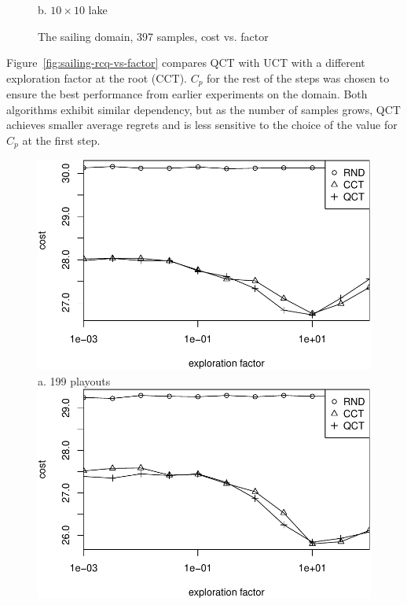 \documentclass{article}
\begin{document}
\begin{figure}[ht]
\begin{minipage}[b]{0.333\linewidth}
    b. $10\times 10$ lake
  \end{minipage}
  \caption{The sailing domain, 397 samples, cost vs. factor}
  \label{fig:sailing-lake-size}
\end{figure}

Figure~\ref{fig:sailing-rcq-vs-factor} compares QCT with UCT with a
different exploration factor at the root (CCT). $C_p$ for the rest of
the steps was chosen to ensure the best performance from earlier
experiments on the domain. Both algorithms exhibit similar dependency,
but as the number of samples grows, QCT achieves smaller average
regrets and is less sensitive to the choice of the value for $C_p$ at
the first step.

\begin{figure}[ht]
  \begin{minipage}[b]{0.5\linewidth}
    \centering
    \includegraphics[scale=0.45]{rcq-size=6-nsamples=199.pdf}\\
    a. 199 playouts\\
    \vspace{1em}
    \includegraphics[scale=0.45]{rcq-size=6-nsamples=397.pdf}\\

\end{minipage}
\end{figure}
\end{document}
